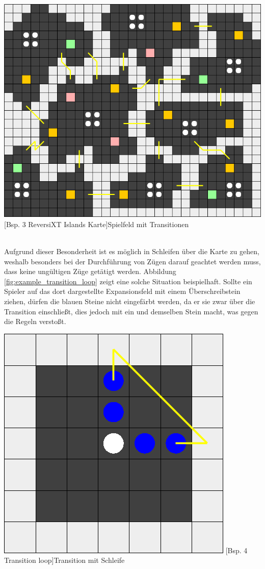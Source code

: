 \documentclass[12pt,a4paper,bibliography=totocnumbered,listof=totocnumbered]{article}
\begin{document}
\vspace{1em}
\begin{minipage}{\linewidth}
	\centering
	\includegraphics[width=0.7\linewidth]{pics/reversixt_islands_map.png}
	[Bsp. 3 ReversiXT Islands Karte]{Spielfeld mit Transitionen}
	\label{fig:reversixt_islands_map}
\end{minipage}
\\

Aufgrund dieser Besonderheit ist es möglich in Schleifen über die Karte zu gehen, weshalb besonders bei der Durchführung von Zügen darauf geachtet werden muss, dass keine ungültigen Züge getätigt werden. Abbildung \ref{fig:example_transition_loop} zeigt eine solche Situation beispielhaft. Sollte ein Spieler auf das dort dargestellte Expansionsfeld mit einem Überschreibstein ziehen, dürfen die blauen Steine nicht eingefärbt werden, da er sie zwar über die Transition einschließt, dies jedoch mit ein und demselben Stein macht, was gegen die Regeln verstoßt.

\vspace{1em}
\begin{minipage}{\linewidth}
	\centering
	\includegraphics[width=0.4\linewidth]{pics/transition_loop.png}
	[Bsp. 4 Transition loop]{Transition mit Schleife}
	\label{fig:example_transition_loop}
\end{minipage}
\\
\end{document}
